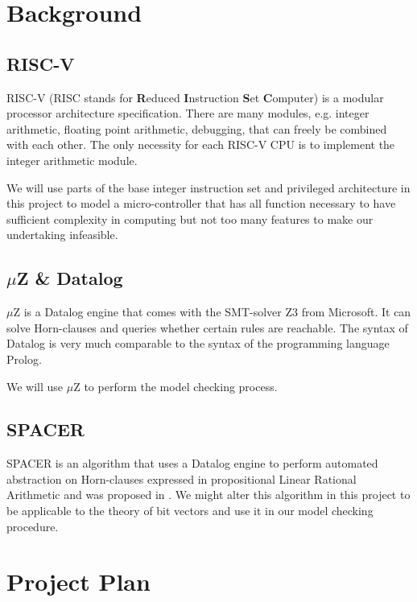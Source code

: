 \documentclass{securem}
\begin{document}
\section{Background}

\subsection{RISC-V}

RISC-V (RISC stands for \textbf{R}educed \textbf{I}nstruction \textbf{S}et \textbf{C}omputer) is a modular processor architecture specification.
There are many modules, e.g. integer arithmetic, floating point arithmetic, debugging, that can freely be combined with each other.
The only necessity for each RISC-V CPU is to implement the integer arithmetic module.

We will use parts of the base integer instruction set and privileged architecture in this project to model a micro-controller that has all function necessary to have sufficient complexity in computing but not too many features to make our undertaking infeasible.

\subsection{$ \mu $Z \& Datalog}

$ \mu $Z is a Datalog engine that comes with the SMT-solver Z3 from Microsoft.
It can solve Horn-clauses and queries whether certain rules are reachable.
The syntax of Datalog is very much comparable to the syntax of the programming language Prolog.

We will use $ \mu $Z to perform the model checking process.

\subsection{SPACER}

SPACER is an algorithm that uses a Datalog engine to perform automated abstraction on Horn-clauses expressed in propositional Linear Rational Arithmetic and was proposed in \cite{Komuravelli13}.
We might alter this algorithm in this project to be applicable to the theory of bit vectors and use it in our model checking procedure.

\section{Project Plan}
\end{document}
